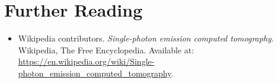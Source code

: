 \section{Further Reading}
\begin{itemize}
  \item Wikipedia contributors. \textit{Single-photon emission computed tomography}. Wikipedia, The Free Encyclopedia. Available at: \url{https://en.wikipedia.org/wiki/Single-photon_emission_computed_tomography}.
\end{itemize}
